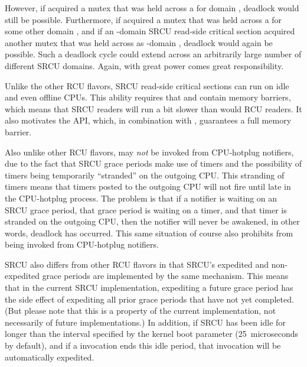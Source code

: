 \begin{fcvref}
However, if  %
acquired a mutex that was held across a
 for domain , deadlock would still be
possible.
Furthermore, if  %
acquired a mutex that was held across a
 for some other domain , and if an
-domain SRCU read-side critical section acquired another mutex
that was held across as -domain , deadlock
would again be possible.
Such a deadlock cycle could extend across an
arbitrarily large number of different SRCU domains.
Again, with great
power comes great responsibility.
\end{fcvref}

Unlike the other RCU flavors, SRCU read-side critical sections can run
on idle and even offline CPUs.
This ability requires that
 and  contain memory barriers,
which means that SRCU readers will run a bit slower than would RCU
readers.
It also motivates the  API,
which, in combination with , guarantees a full
memory barrier.

Also unlike other RCU flavors,  may \emph{not} be
invoked from CPU-hotplug notifiers, due to the fact that SRCU grace
periods make use of timers and the possibility of timers being
temporarily ``stranded'' on the outgoing CPU\@.
This stranding of timers
means that timers posted to the outgoing CPU will not fire until late in
the CPU-hotplug process.
The problem is that if a notifier is waiting on
an SRCU grace period, that grace period is waiting on a timer, and that
timer is stranded on the outgoing CPU, then the notifier will never be
awakened, in other words, deadlock has occurred.
This same situation of
course also prohibits  from being invoked from
CPU-hotplug notifiers.

SRCU also differs from other RCU flavors in that SRCU's expedited and
non-expedited grace periods are implemented by the same mechanism.
This
means that in the current SRCU implementation, expediting a future grace
period has the side effect of expediting all prior grace periods that
have not yet completed.
(But please note that this is a property of the
current implementation, not necessarily of future implementations.)
In
addition, if SRCU has been idle for longer than the interval specified
by the  kernel boot parameter (25 microseconds
by default), and if a  invocation ends this idle
period, that invocation will be automatically expedited.

